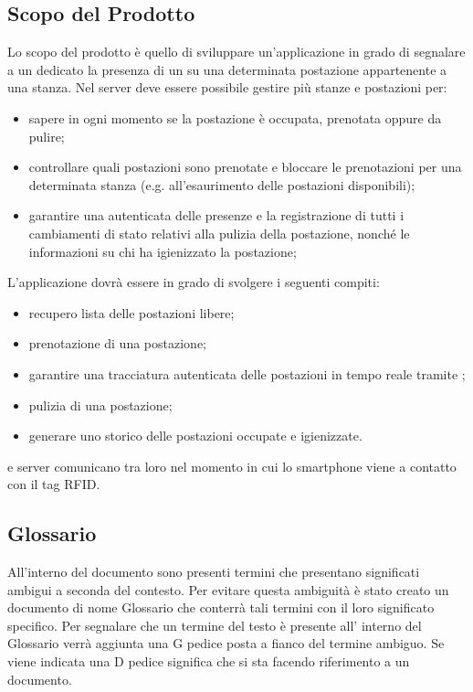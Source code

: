 \subsection{Scopo del Prodotto}
Lo scopo del prodotto è quello di sviluppare un’applicazione in grado di
segnalare a un  dedicato la presenza di un  su una determinata postazione appartenente a
una stanza. 
Nel server deve essere possibile gestire più stanze e postazioni per:
\begin{itemize}
\item{sapere in ogni momento se la postazione è occupata, prenotata oppure da pulire;}
\item{controllare quali postazioni sono prenotate e bloccare le prenotazioni per una determinata
stanza (e.g. all'esaurimento delle postazioni disponibili);}
\item{garantire una  autenticata delle presenze e la registrazione di tutti i cambiamenti di stato relativi alla pulizia della
postazione, nonché le informazioni su chi ha igienizzato la postazione;}
\end{itemize}
L'applicazione dovrà essere in grado di svolgere i seguenti compiti:
\begin{itemize}
\item{recupero lista delle postazioni libere;}
\item{prenotazione di una postazione;}
\item{garantire una tracciatura autenticata delle postazioni in tempo reale tramite  ;}
\item{pulizia di una postazione;}
\item{generare uno storico delle postazioni occupate e igienizzate.}
\end{itemize}
 e server comunicano tra loro nel momento in cui lo smartphone viene  a contatto con il tag RFID.

\subsection{Glossario}
All’interno del  documento sono presenti termini che presentano significati ambigui a seconda del contesto.
Per evitare questa ambiguità è stato creato un  documento di nome Glossario che  conterrà tali termini con il loro significato specifico. Per segnalare che un termine del testo è presente all’ interno del Glossario  
verrà aggiunta una G pedice posta a fianco del termine ambiguo. 
Se viene indicata una D pedice significa che si sta facendo riferimento a un documento.

